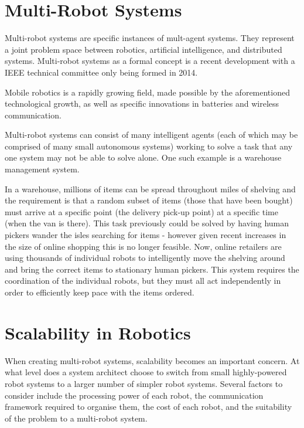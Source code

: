 \documentclass[../dissertation.tex]{subfiles}
\begin{document}
\section{Multi-Robot Systems}

Multi-robot systems are specific instances of mult-agent systems. They represent a joint problem space between robotics, artificial intelligence, and distributed systems. Multi-robot systems as a formal concept is a recent development with a IEEE technical committee only being formed in 2014\cite{MultiRobotSystemsIEEECommittee}.

Mobile robotics is a rapidly growing field, made possible by the aforementioned technological growth, as well as specific innovations in batteries and wireless communication.

Multi-robot systems can consist of many intelligent agents (each of which may be comprised of many small autonomous systems) working to solve a task that any one system may not be able to solve alone. One such example is a warehouse management system.

In a warehouse, millions of items can be spread throughout miles of shelving and the requirement is that a random subset of items (those that have been bought) must arrive at a specific point (the delivery pick-up point) at a specific time (when the van is there). This task previously could be solved by having human pickers wander the isles searching for items - however given recent increases in the size of online shopping this is no longer feasible. Now, online retailers are using thousands of individual robots to intelligently move the shelving around and bring the correct items to stationary human pickers. This system requires the coordination of the individual robots, but they must all act independently in order to efficiently keep pace with the items ordered.

\section{Scalability in Robotics}

When creating multi-robot systems, scalability becomes an important concern. At what level does a system architect choose to switch from small highly-powered robot systems to a larger number of simpler robot systems. Several factors to consider include the processing power of each robot, the communication framework required to organise them, the cost of each robot, and the suitability of the problem to a multi-robot system.
\end{document}
